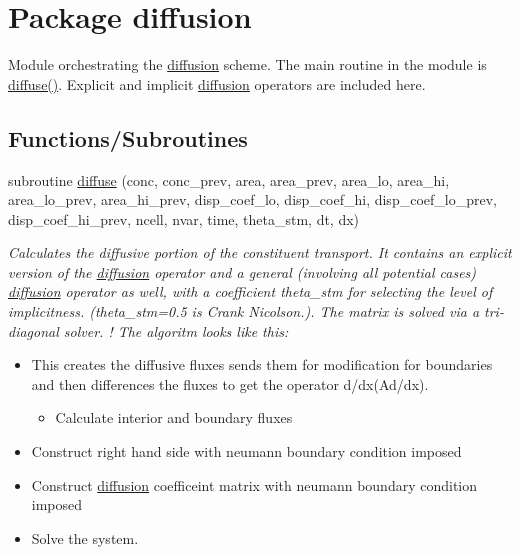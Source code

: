 \hypertarget{a00056}{
\section{Package diffusion}
\label{a00056}
}
Module orchestrating the \hyperlink{a00056}{diffusion} scheme. The main routine in the module is \hyperlink{a00056_b108f04e81c5fda27fe18ee2aa18086c}{diffuse()}. Explicit and implicit \hyperlink{a00056}{diffusion} operators are included here.  


\subsection*{Functions/Subroutines}
\begin{CompactItemize}
\item 
subroutine \hyperlink{a00056_b108f04e81c5fda27fe18ee2aa18086c}{diffuse} (conc, conc\_\-prev, area, area\_\-prev, area\_\-lo, area\_\-hi, area\_\-lo\_\-prev, area\_\-hi\_\-prev, disp\_\-coef\_\-lo, disp\_\-coef\_\-hi, disp\_\-coef\_\-lo\_\-prev, disp\_\-coef\_\-hi\_\-prev, ncell, nvar, time, theta\_\-stm, dt, dx)
\begin{CompactList}\small\item\em Calculates the diffusive portion of the constituent transport. It contains an explicit version of the \hyperlink{a00056}{diffusion} operator and a general (involving all potential cases) \hyperlink{a00056}{diffusion} operator as well, with a coefficient theta\_\-stm for selecting the level of implicitness. (theta\_\-stm=0.5 is Crank Nicolson.). The matrix is solved via a tri-diagonal solver. ! The algoritm looks like this:\begin{itemize}
\item This creates the diffusive fluxes sends them for modification for boundaries and then differences the fluxes to get the operator d/dx(Ad/dx).\begin{itemize}
\item Calculate interior and boundary fluxes\end{itemize}
\item Construct right hand side with neumann boundary condition imposed\item Construct \hyperlink{a00056}{diffusion} coefficeint matrix with neumann boundary condition imposed\item Solve the system. \end{itemize}
\item\end{CompactList}\item 

\end{CompactItemize}
